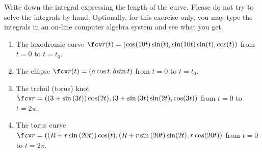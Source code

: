 Write down the integral expressing the length of the curve. Please do not try to solve the integrals by hand. Optionally, for this exercise only, you may type the integrals in an on-line computer algebra system and see what you get.

\begin{enumerate}
\item The loxodromic curve $\fcv r(t)= ( \cos (10t) \sin (t), \sin (10t)\sin (t), \cos (t) )$ from $t=0$ to $t=t_0$.
\item The ellipse $\fcv r(t) = ( a\cos t, b\sin t ) $ from $t=0$ to $t=t_0$.
\item The trefoil (torus) knot
$\fcv r=( \left( 3+\sin \left(3t\right)\right) \cos (2t) ,(3+\sin \left( 3t \right) \sin (2t) ,\cos (3t))
$
from $t=0$ to $t=2\pi$.
\item The torus curve
$\fcv r=( \left( R+r\sin \left(20t\right)\right) \cos (t) ,(R+r\sin \left( 20t \right) \sin (2t) ,r\cos (20t))
$
from $t=0$ to $t=2\pi$.
\end{enumerate}
